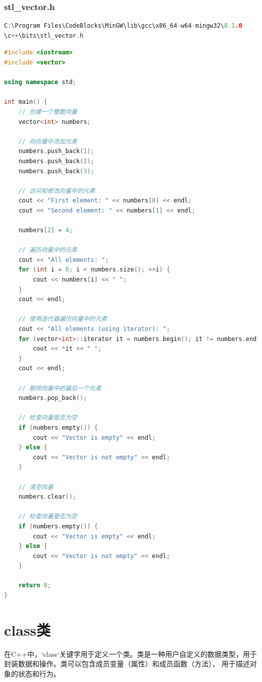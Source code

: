 \documentclass[12pt,twiside,a4paper]{ctexbook}
\numberwithin{chapter}{part}
\begin{document}
\subsection{stl\_vector.h}
\begin{lstlisting}[language=C++]
C:\Program Files\CodeBlocks\MinGW\lib\gcc\x86_64-w64-mingw32\8.1.0
\c++\bits\stl_vector.h
\end{lstlisting}
\begin{lstlisting}[language=C++]
#include <iostream>
#include <vector>

using namespace std;

int main() {
    // 创建一个整数向量
    vector<int> numbers;

    // 向向量中添加元素
    numbers.push_back(1);
    numbers.push_back(2);
    numbers.push_back(3);

    // 访问和修改向量中的元素
    cout << "First element: " << numbers[0] << endl;
    cout << "Second element: " << numbers[1] << endl;

    numbers[2] = 4;

    // 遍历向量中的元素
    cout << "All elements: ";
    for (int i = 0; i < numbers.size(); ++i) {
        cout << numbers[i] << " ";
    }
    cout << endl;

    // 使用迭代器遍历向量中的元素
    cout << "All elements (using iterator): ";
    for (vector<int>::iterator it = numbers.begin(); it != numbers.end(); ++it) {
        cout << *it << " ";
    }
    cout << endl;

    // 删除向量中的最后一个元素
    numbers.pop_back();

    // 检查向量是否为空
    if (numbers.empty()) {
        cout << "Vector is empty" << endl;
    } else {
        cout << "Vector is not empty" << endl;
    }

    // 清空向量
    numbers.clear();

    // 检查向量是否为空
    if (numbers.empty()) {
        cout << "Vector is empty" << endl;
    } else {
        cout << "Vector is not empty" << endl;
    }

    return 0;
}
\end{lstlisting}

\chapter{class类}
在C++中，`class`关键字用于定义一个类。类是一种用户自定义的数据类型，用于封装数据和操作。类可以包含成员变量（属性）和成员函数（方法），
用于描述对象的状态和行为。
\end{document}

